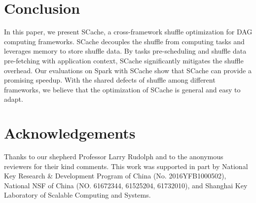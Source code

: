 \section{Conclusion}
In this paper, we present SCache, a cross-framework shuffle optimization for DAG computing frameworks. 
SCache decouples the shuffle from computing tasks and leverages memory to store shuffle data. 
By tasks pre-scheduling and shuffle data pre-fetching with application context, SCache significantly mitigates the shuffle overhead. 
Our evaluations on Spark with SCache show that SCache can provide a promising speedup. 
With the shared defects of shuffle among different frameworks, we believe that the optimization of SCache is general and easy to adapt. 

\section{Acknowledgements}
Thanks to our shepherd Professor Larry Rudolph and to the anonymous reviewers for their kind comments. This work was supported in part by National Key Research \& Development Program of China (No. 2016YFB1000502), National NSF of China (NO. 61672344, 61525204, 61732010), and Shanghai Key Laboratory of Scalable Computing and Systems.